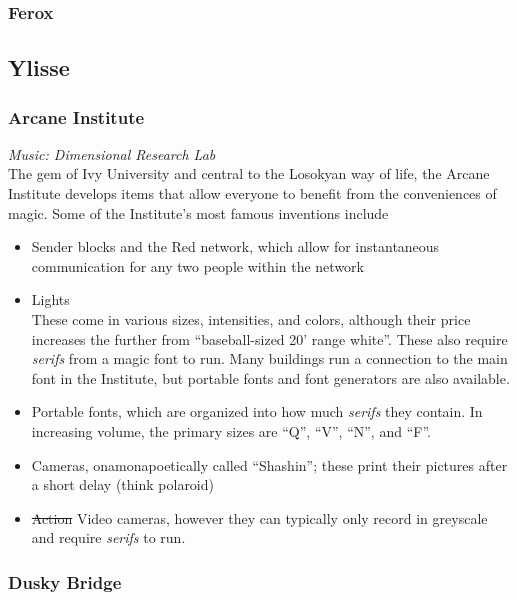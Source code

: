 \subsubsection{Ferox}
\label{places:ferox}

\subsection{Ylisse}
\label{nations:ylisse}

\subsubsection{Arcane Institute}
\label{places:arcaneinstitute}
\textit{Music: Dimensional Research Lab}\\
The gem of Ivy University and central to the Losokyan way of life, the Arcane Institute develops items that allow everyone to benefit from the conveniences of magic. Some of the Institute's most famous inventions include
\begin{itemize}
\item Sender blocks and the Red network, which allow for instantaneous communication for any two people within the network\\

\item Lights\\
These come in various sizes, intensities, and colors, although their price increases the further from ``baseball-sized 20' range white''. These also require \textit{serifs} from a magic font to run. Many buildings run a connection to the main font in the Institute, but portable fonts and font generators are also available.
\item Portable fonts, which are organized into how much \textit{serifs} they contain. In increasing volume, the primary sizes are ``Q'', ``V'', ``N'', and ``F''. 
\item Cameras, onamonapoetically called ``Shashin''; these print their pictures after a short delay (think polaroid)
\item \st{Action} Video cameras, however they can typically only record in greyscale and require \textit{serifs} to run.
\end{itemize}

\subsubsection{Dusky Bridge}
\label{places:duskybridge}


